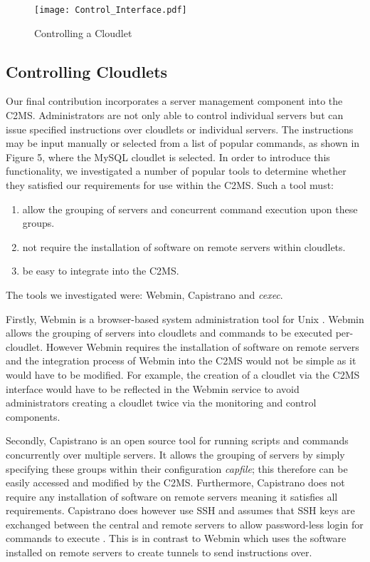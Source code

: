 \documentclass[10pt, conference, compsocconf]{IEEEtran}
\begin{document}
\begin{figure*}[ht]
  \begin{center}
\texttt{[image: Control\_Interface.pdf]}
  \end{center}
 \caption{Controlling a Cloudlet}
\end{figure*}

\subsection{Controlling Cloudlets}
Our final contribution incorporates a server management component into the C2MS. Administrators are not only able to control individual servers but can issue specified instructions over cloudlets or individual servers. The instructions may be input manually or selected from a list of popular commands, as shown in Figure 5, where the MySQL cloudlet is selected. In order to introduce this functionality, we investigated a number of popular tools to determine whether they satisfied our requirements for use within the C2MS. Such a tool must:

\begin{enumerate}
\item allow the grouping of servers and concurrent command execution upon these groups.
\item not require the installation of software on remote servers within cloudlets.
\item be easy to integrate into the C2MS.
\end{enumerate}

\noindent The tools we investigated were: Webmin, Capistrano and \textit{cexec}.

Firstly, Webmin is a browser-based system administration tool for Unix \cite{webmin}. Webmin allows the grouping of servers into cloudlets and commands to be executed per-cloudlet. However Webmin requires the installation of software on remote servers and the integration process of Webmin into the C2MS would not be simple as it would have to be modified. For example, the creation of a cloudlet via the C2MS interface would have to be reflected in the Webmin service to avoid administrators creating a cloudlet twice via the monitoring and control components.

Secondly, Capistrano is an open source tool for running scripts and commands concurrently over multiple servers. It allows the grouping of servers by simply specifying these groups within their configuration \textit{capfile}; this therefore can be easily accessed and modified by the C2MS. Furthermore, Capistrano does not require any installation of software on remote servers meaning it satisfies all requirements. Capistrano does however use SSH and assumes that SSH keys are exchanged between the central and remote servers to allow password-less login for commands to execute \cite{ssh_passwordless}. This is in contrast to Webmin which uses the software installed on remote servers to create tunnels to send instructions over.
\end{document}
